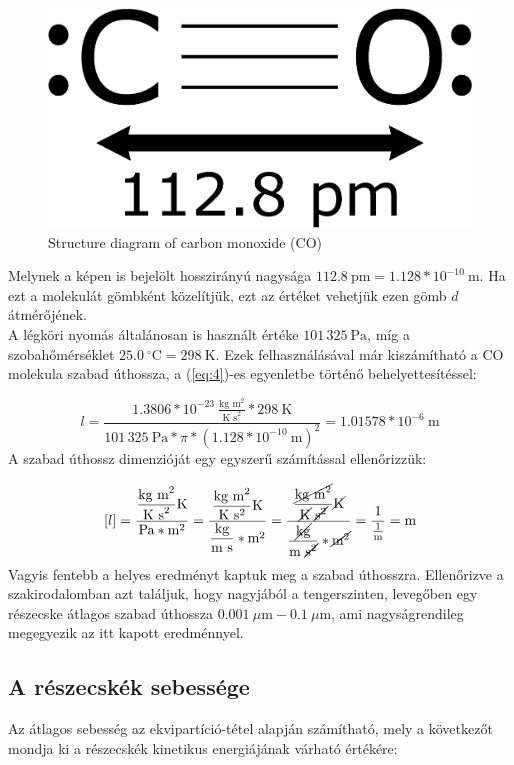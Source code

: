 \begin{figure}[h]
    \centering
    \includegraphics[width=.2\textwidth]{images/Carbon_monoxide_2D.eps}
    \caption{Structure diagram of carbon monoxide (CO)}
    \label{fig:1}
\end{figure}

Melynek a képen is bejelölt hosszirányú nagysága $112.8\ \text{pm} = 1.128 * 10^{-10}\ \text{m}$. Ha ezt a molekulát gömbként közelítjük, ezt az értéket vehetjük ezen gömb $d$ átmérőjének. \\
A légköri nyomás általánosan is használt értéke $101\,325\ \text{Pa}$, míg a szobahőmérséklet $25.0\ ^{\circ}\text{C} = 298\ \text{K}$. Ezek felhasználásával már kiszámítható a CO molekula szabad úthossza, a (\ref{eq:4})-es egyenletbe történő behelyettesítéssel:

\begin{equation}
    l
    =
    \frac{ 1.3806 * 10^{-23}\ \frac{\text{kg m}^{2}}{\text{K s}^{2}} * 298\ \text{K}} { 101\,325\ \text{Pa} * \pi * \left( 1.128 * 10^{-10}\ \text{m} \right)^{2}}
    =
    \boxed{1.01578 * 10^{-6}\ \text{m}}
\end{equation}
A szabad úthossz dimenzióját egy egyszerű számítással ellenőrizzük:

\begin{equation}
    \left[ l \right]
    =
    \frac{\dfrac{\text{kg m}^{2}}{\text{K s}^{2}}\text{K}}{\text{Pa} * \text{m}^{2}}
    =
    \frac{\dfrac{\text{kg m}^{2}}{\text{K}\ \text{s}^{2}}\text{K}}
         {\dfrac{\text{kg}}{\text{m}\ \text{s}} * \text{m}^{2}}
    =
    \frac{\dfrac{\cancel{\text{kg m}^{2}}}{\cancel{\text{K}}\ \cancel{\text{s}^{2}}} \cancel{\text{K}}}
         {\dfrac{\cancel{\text{kg}}}{\text{m}\ \cancel{\text{s}^{2}}} * \cancel{\text{m}^{2}}}
    =
    \frac{1}{\frac{1}{\text{m}}}
    =
    \text{m}
\end{equation}
Vagyis fentebb a helyes eredményt kaptuk meg a szabad úthosszra. Ellenőrizve a szakirodalomban azt találjuk\cite{mfponsealevel}\cite{jennings1988mean}, hogy nagyjából a tengerszinten, levegőben egy részecske átlagos szabad úthossza $0.001\ \text{$\mu$m} - 0.1\ \text{$\mu$m}$, ami nagyságrendileg megegyezik az itt kapott eredménnyel.

\subsection{A részecskék sebessége} \label{sub:1.4}
Az átlagos sebesség az ekvipartíció-tétel alapján számítható, mely a következőt mondja ki a részecskék kinetikus energiájának várható értékére:

